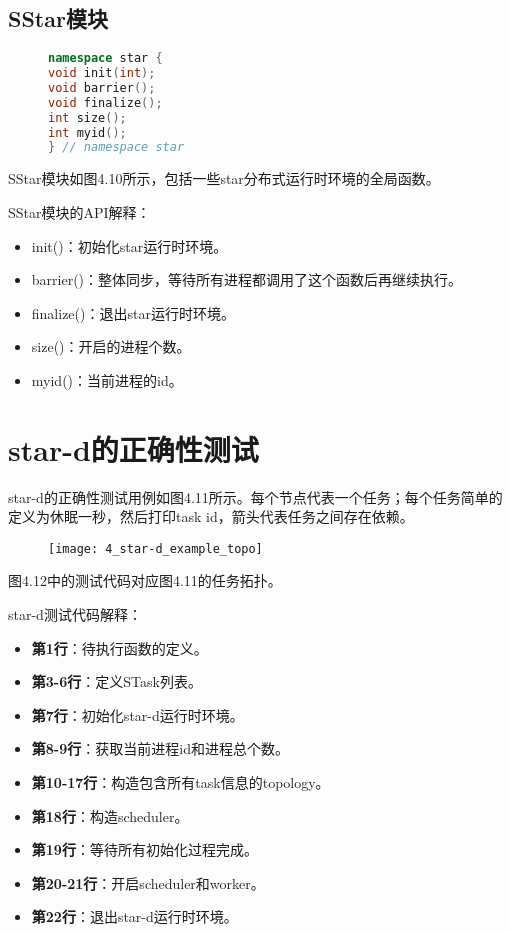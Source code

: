 \subsection{SStar模块}

\begin{figure}[!htbp]
    \centering
\begin{lstlisting}[language=c++,caption={}]
namespace star {
void init(int);
void barrier();
void finalize();
int size();
int myid();
} // namespace star
\end{lstlisting}
    \label{fig:4_sstar}
\end{figure}

SStar模块如图4.10所示，包括一些star分布式运行时环境的全局函数。

SStar模块的API解释：

\begin{itemize}
	\item init()：初始化star运行时环境。
	\item barrier()：整体同步，等待所有进程都调用了这个函数后再继续执行。
	\item finalize()：退出star运行时环境。
	\item size()：开启的进程个数。
	\item myid()：当前进程的id。
\end{itemize}

\section{star-d的正确性测试}

star-d的正确性测试用例如图4.11所示。每个节点代表一个任务；每个任务简单的定义为休眠一秒，然后打印task id，箭头代表任务之间存在依赖。

\begin{figure}[!htbp]
    \centering
    \texttt{[image: 4\_star-d\_example\_topo]}
    \label{fig:4_star-d_example_topo}
\end{figure}

图4.12中的测试代码对应图4.11的任务拓扑。

star-d测试代码解释：

\begin{itemize}
	\item \textbf{第1行}：待执行函数的定义。
	\item \textbf{第3-6行}：定义STask列表。
	\item \textbf{第7行}：初始化star-d运行时环境。
	\item \textbf{第8-9行}：获取当前进程id和进程总个数。
	\item \textbf{第10-17行}：构造包含所有task信息的topology。
	\item \textbf{第18行}：构造scheduler。
	\item \textbf{第19行}：等待所有初始化过程完成。
	\item \textbf{第20-21行}：开启scheduler和worker。
	\item \textbf{第22行}：退出star-d运行时环境。
\end{itemize}

